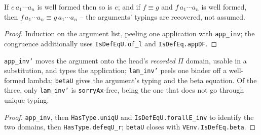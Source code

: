 \begin{lemma}
\label{vpc:thm:wf-appn-inv}
\leanok
{}

 If $e\,a_1\cdots a_n$ is well formed then so is $e$; and if $f \equiv g$ and
$f\,a_1\cdots a_n$ is well formed, then $f\,a_1\cdots a_n \equiv g\,a_1\cdots a_n$ -- the
arguments' typings are recovered, not assumed.
\end{lemma}
\begin{proof}\leanok
{}
 Induction on the argument list, peeling one application with \texttt{app\_inv}; the
congruence additionally uses \texttt{IsDefEqU.of\_l} and \texttt{IsDefEq.appDF}.
\end{proof}

\begin{lemma}
\label{vpc:thm:wf-inv-prime}
\leanok
{}

 \texttt{app\_inv'} moves the argument onto the head's \emph{recorded} $\Pi$
domain, usable in a substitution, and types the application; \texttt{lam\_inv'} peels one binder
off a well-formed lambda; \texttt{betaU} gives the argument's typing and the beta equation.
 Of the three, only \texttt{lam\_inv'} is \texttt{sorryAx}-free, being the one
that does not go through unique typing.
\end{lemma}
\begin{proof}\leanok
{}
 \texttt{app\_inv}, then \texttt{HasType.uniqU} and \texttt{IsDefEqU.forallE\_inv} to
identify the two domains, then \texttt{HasType.defeqU\_r}; \texttt{betaU} closes with
\texttt{VEnv.IsDefEq.beta}.
\end{proof}

